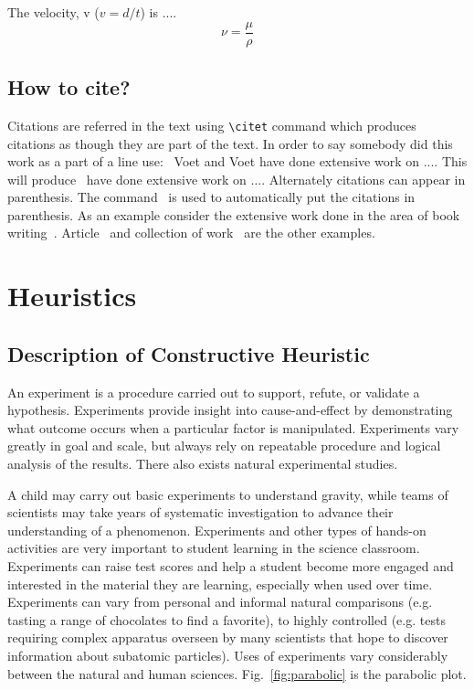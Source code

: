 \documentclass[11pt, a4paper]{article}
\begin{document}
The velocity, v ($v=d/t$) is ....
%
\begin{equation}\label{eq: momentum diff}
\nu = \frac{\mu}{\rho}
\end{equation}

\subsection{How to cite?}
Citations are referred in the text using \verb|\citet| command which produces citations
as though they are part of the text. In order to say somebody did this work as a part of a line use:~ Voet and Voet have done extensive work on .... This will produce~\citet{voet2011biochemistry} have done extensive work on .... Alternately citations can appear in parenthesis. The command~\citep{voet2011biochemistry} is used to automatically put the citations in parenthesis. As an example consider the extensive work done in the area of book writing~\citep{seifert1991shape}.
Article~\citep{sircar1972adsorption,keh1995particle} and collection of work~\citep{seifert1995morphology} are the other examples.

\section{Heuristics}\label{sec:exp}

\subsection{Description of Constructive Heuristic}
An experiment is a procedure carried out to support, refute, or validate a hypothesis. Experiments provide insight into cause-and-effect by demonstrating what outcome occurs when a particular factor is manipulated. Experiments vary greatly in goal and scale, but always rely on repeatable procedure and logical analysis of the results. There also exists natural experimental studies.

A child may carry out basic experiments to understand gravity, while teams of scientists may take years of systematic investigation to advance their understanding of a phenomenon. Experiments and other types of hands-on activities are very important to student learning in the science classroom. Experiments can raise test scores and help a student become more engaged and interested in the material they are learning, especially when used over time. Experiments can vary from personal and informal natural comparisons (e.g. tasting a range of chocolates to find a favorite), to highly controlled (e.g. tests requiring complex apparatus overseen by many scientists that hope to discover information about subatomic particles). Uses of experiments vary considerably between the natural and human sciences. Fig.~\ref{fig:parabolic} is the parabolic plot.
\end{document}
